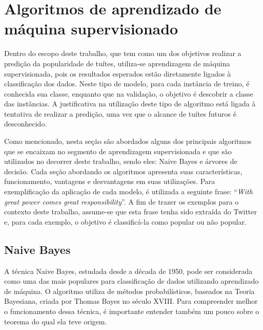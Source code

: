 \documentclass[oneside,openright,12pt]{ufsm_2015} %
\begin{document}

\section{Algoritmos de aprendizado de máquina supervisionado}
\label{sec:fund-alg-am-sup}

    \par Dentro do escopo deste trabalho, que tem como um dos objetivos realizar a predição da popularidade de tuítes, utiliza-se aprendizagem de máquina supervisionada, pois os resultados esperados estão diretamente ligados à classificação dos dados. Neste tipo de modelo, para cada instância de treino, é conhecida sua classe, enquanto que na validação, o objetivo é descobrir a classe das instâncias. A justificativa na utilização deste tipo de algoritmo está ligada à tentativa de realizar a predição, uma vez que o alcance de tuítes futuros é desconhecido.
    
    \par Como mencionado, nesta seção são abordados alguns dos principais algoritmos que se encaixam no segmento de aprendizagem supervisionada e que são utilizados no decorrer deste trabalho, sendo eles: Naive Bayes e árvores de decisão. Cada seção abordando os algoritmos apresenta suas características, funcionamento, vantagens e desvantagens em suas utilizações. Para exemplificação da aplicação de cada modelo, é utilizada a seguinte frase: ``\textit{With great power comes great responsibility}''. A fim de trazer os exemplos para o contexto deste trabalho, assume-se que esta frase tenha sido extraída do Twitter e, para cada exemplo, o objetivo é classificá-la como popular ou não popular.


\subsection{Naive Bayes}
\label{sec:fund-naive-bayes}

    \par A técnica Naive Bayes, estudada desde a década de 1950, pode ser considerada como uma das mais populares para classificação de dados utilizando aprendizado de máquina. O algoritmo utiliza de métodos probabilísticos, baseados na Teoria Bayesiana, criada por Thomas Bayes no século XVIII. Para compreender melhor o funcionamento dessa técnica, é importante entender também um pouco sobre o teorema do qual ela teve origem.
\end{document}
